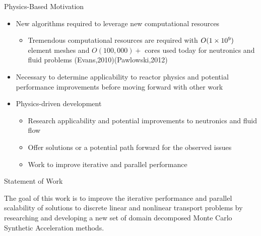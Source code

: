 \documentclass{beamer}
\begin{document}
\begin{frame}{Physics-Based Motivation}

  \begin{itemize}
  \item New algorithms required to leverage new computational
    resources
    \begin{itemize}
    \item Tremendous computational resources are required with
      $O(1\times 10^{9})$ element meshes and $O(100,000)+$ cores used today
      for neutronics and fluid problems (Evans,2010)(Pawlowski,2012)
    \end{itemize}
    \bigskip
  \item Necessary to determine applicability to reactor physics and
    potential performance improvements before moving forward with
    other work
    \bigskip
  \item Physics-driven development
    \begin{itemize}
    \item Research applicability and potential improvements to
      neutronics and fluid flow
    \item Offer solutions or a potential path forward for the observed
      issues
    \item Work to improve iterative and parallel performance
    \end{itemize}
  \end{itemize}

\end{frame}

\begin{frame}{Statement of Work}

  The goal of this work is to improve the iterative performance and
  parallel scalability of solutions to discrete linear and nonlinear
  transport problems by researching and developing a new set of domain
  decomposed Monte Carlo Synthetic Acceleration methods.

\end{frame}
\end{document}
